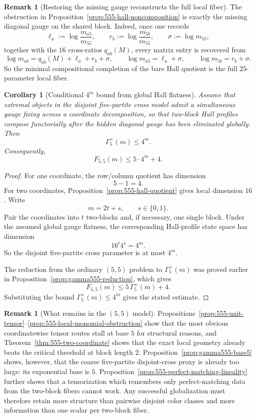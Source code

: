 \documentclass[11pt]{article}
\newtheorem{corollary}[theorem]{Corollary}
\theoremstyle{definition}
\newtheorem{remark}[theorem]{Remark}
\newcommand{\1}{\mathbf{1}}
\begin{document}
\begin{remark}[Restoring the missing gauge reconstructs the full local fiber]\label{rem:555-hall-gauge}
The obstruction in Proposition~\ref{prop:555-hall-noncomposition} is exactly the missing diagonal gauge on the shared block.
Indeed, once one records
\[
\ell_a:=\log\frac{m_{a5}}{m_{55}},
\qquad
r_b:=\log\frac{m_{5b}}{m_{55}},
\qquad
\sigma:=\log m_{55},
\]
together with the $16$ cross-ratios $q_{ab}(M)$, every matrix entry is recovered from
\[
\log m_{ab}=q_{ab}(M)+\ell_a+r_b+\sigma,
\qquad
\log m_{a5}=\ell_a+\sigma,
\qquad
\log m_{5b}=r_b+\sigma.
\]
So the minimal compositional completion of the bare Hall quotient is the full $25$-parameter local fiber.
\end{remark}

\begin{corollary}[Conditional $4^m$ bound from global Hall flatness]\label{cor:555-hall-flatness}
Assume that extremal objects in the disjoint five-partite cross model admit a simultaneous gauge fixing across a coordinate decomposition, so that two-block Hall profiles compose functorially after the hidden diagonal gauge has been eliminated globally.
Then
\[
\Gamma_5^\times(m)\le 4^m.
\]
Consequently,
\[
F_{5,5}(m)\le 5\cdot 4^m+4.
\]
\end{corollary}

\begin{proof}
For one coordinate, the row/column quotient has dimension
\[
5-1=4.
\]
For two coordinates, Proposition~\ref{prop:555-hall-quotient} gives local dimension $16$.
Write
\[
m=2t+s,
\qquad
s\in\{0,1\}.
\]
Pair the coordinates into $t$ two-blocks and, if necessary, one single block.
Under the assumed global gauge flatness, the corresponding Hall-profile state space has dimension
\[
16^t 4^s = 4^m.
\]
So the disjoint five-partite cross parameter is at most $4^m$.

The reduction from the ordinary $(5,5)$ problem to $\Gamma_5^\times(m)$ was proved earlier in Proposition~\ref{prop:gamma555-reduction}, which gives
\[
F_{5,5}(m)\le 5\,\Gamma_5^\times(m)+4.
\]
Substituting the bound $\Gamma_5^\times(m)\le 4^m$ gives the stated estimate.
\end{proof}

\begin{remark}[What remains in the $(5,5)$ model]\label{rem:555-what-remains}
Propositions~\ref{prop:555-unit-tensor}--\ref{prop:555-local-monomial-obstruction} show that the most obvious coordinatewise tensor routes stall at base $5$ for structural reasons, and Theorem~\ref{thm:555-two-coordinate} shows that the exact local geometry already beats the critical threshold at block length $2$. Proposition~\ref{prop:gamma555-base5} shows, however, that the coarse five-partite disjoint-cross proxy is already too large: its exponential base is $5$. Proposition~\ref{prop:555-perfect-matching-lineality} further shows that a tensorization which remembers only perfect-matching data from the two-block fibers cannot work. Any successful globalization must therefore retain more structure than pairwise disjoint color classes and more information than one scalar per two-block fiber.
\end{remark}
\end{document}
